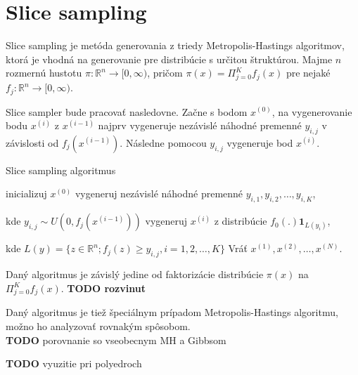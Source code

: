\section{Slice sampling}

Slice sampling je metóda generovania z triedy Metropolis-Hastings algoritmov, ktorá je vhodná na generovanie pre distribúcie s určitou štruktúrou.
Majme $n$ rozmernú hustotu $\pi: \mathbb{R}^n \rightarrow [0,\infty)$, pričom $\pi(x) = \Pi^K_{j=0}f_j(x)$ pre nejaké $f_j: \mathbb{R}^n \rightarrow [0,\infty)$.

Slice sampler bude pracovať nasledovne. Začne s bodom $x^{(0)}$, na vygenerovanie bodu $x^{(i)}$ z $x^{(i-1)}$ najprv vygeneruje nezávislé náhodné premenné $y_{i,j}$ v závislosti od $f_j(x^{(i-1)})$. Následne pomocou $y_{i,j}$ vygeneruje bod $x^{(i)}$.

\begin{algorithm}[H]
	\caption{Slice sampling algoritmus \cite{slice_convergence_roberts}}
	\label{slice}
	\begin{algorithmic}[1]
		\State inicializuj $x^{(0)}$
			\State vygeneruj nezávislé náhodné premenné $y_{i,1},y_{i,2},\dots, y_{i,K}$,

			kde $y_{i,j} \sim U(0,f_j(x^{(i-1)}))$
			\State vygeneruj $x^{(i)}$ z distribúcie $f_0(.)\mathbf{1}_{L(y_{i})}$,

			kde $L(y)= \{ z \in \mathbb{R}^n; f_j(z) \geq y_{i,j}, i=1,2, \dots, K\}$
		\EndFor
		\State Vráť ${x^{(1)},x^{(2)},\dots,x^{(N)}}$.
	\end{algorithmic}
\end{algorithm}

Daný algoritmus je závislý jedine od faktorizácie distribúcie $\pi(x)$ na $\Pi^K_{j=0}f_j(x)$. \textbf{TODO rozvinut}

Daný algoritmus je tiež špeciálnym prípadom Metropolis-Hastings algoritmu, možno ho analyzovať rovnakým spôsobom.\\

\textbf{TODO} porovnanie so vseobecnym MH a Gibbsom

\textbf{TODO} vyuzitie pri polyedroch
